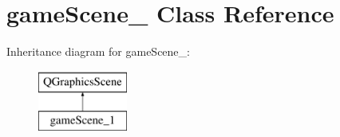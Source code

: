 \hypertarget{classgameScene__1}{\section{game\-Scene\-\_ Class Reference}
\label{classgameScene__1}
}
Inheritance diagram for game\-Scene\-\_\-:\begin{figure}[H]
\begin{center}
\leavevmode
\includegraphics[height=2.000000cm]{classgameScene__1}
\end{center}
\end{figure}
